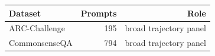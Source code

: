\begin{tabular}{@{}lrr@{}}
\toprule
\textbf{Dataset} & \textbf{Prompts} & \textbf{Role} \\
\midrule
ARC-Challenge & 195 & broad trajectory panel \\
CommonsenseQA & 794 & broad trajectory panel \\
\bottomrule
\end{tabular}
